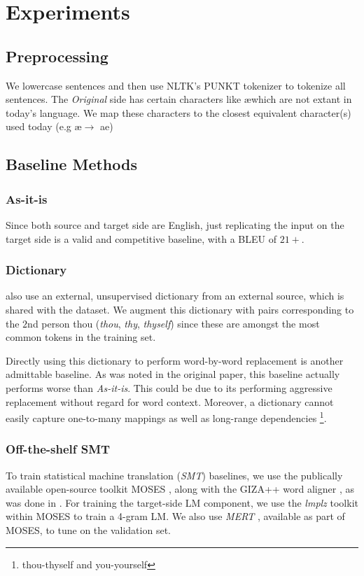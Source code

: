 \section{Experiments} \label{sec:Experiments}
\subsection{Preprocessing}
We lowercase sentences and then use NLTK's PUNKT tokenizer to tokenize all sentences. The \textit{Original} side has certain characters like \ae which are not extant in today's language. We map these characters to the closest equivalent character(s) used today (e.g \ae $\rightarrow$ ae)

\subsection{Baseline Methods}
\subsubsection{As-it-is}
Since both source and target side are English, just replicating the input on the target side is a valid and competitive baseline, with a BLEU of $21+$.

\subsubsection{Dictionary}
\cite{xu2012paraphrasing} also use an external, unsupervised dictionary from an external source, which is shared with the dataset. We augment this dictionary with pairs corresponding to the $2$nd person thou (\textit{thou}, \textit{thy}, \textit{thyself}) since these are amongst the most common tokens in the training set.

Directly using this dictionary to perform word-by-word replacement is another admittable baseline. As was noted in the original paper,  this baseline actually performs worse than \textit{As-it-is}. This could be due to its performing aggressive replacement without regard for word context. Moreover, a dictionary cannot easily capture one-to-many mappings as well as long-range dependencies \footnote{thou-thyself and you-yourself}.

\subsubsection{Off-the-shelf SMT}
To train statistical machine translation (\textit{SMT}) baselines, we use the publically available open-source toolkit MOSES \cite{koehn2007moses}, along with the GIZA++  word aligner \cite{och2003minimum}, as was done in \cite{xu2012paraphrasing}. For training the target-side LM component, we use the \textit{lmplz} toolkit within MOSES to train a 4-gram LM. We also use \textit{MERT}  \cite{och2003minimum}, available as part of MOSES, to tune on the validation set.

